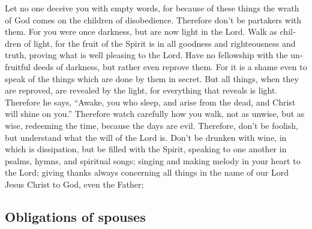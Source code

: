 \begin{paracol}{2}
\begin{otherlanguage}{english}
 Let no one deceive you with empty words, for because of
these things the wrath of God comes on the children of disobedience.
 Therefore don't be partakers with them. 
For you were once darkness, but are now light in the Lord. Walk as
children of light,  for the fruit of the Spirit is in all
goodness and righteousness and truth,  proving what is
well pleasing to the Lord.  Have no fellowship with the
unfruitful deeds of darkness, but rather even reprove them.
 For it is a shame even to speak of the things which are
done by them in secret.  But all things, when they are
reproved, are revealed by the light, for everything that reveals is
light.  Therefore he says, ``Awake, you who sleep, and
arise from the dead, and Christ will shine on you.'' 
Therefore watch carefully how you walk, not as unwise, but as wise,
 redeeming the time, because the days are evil.
 Therefore, don't be foolish, but understand what the
will of the Lord is.  Don't be drunken with wine, in
which is dissipation, but be filled with the Spirit, 
speaking to one another in psalms, hymns, and spiritual songs; singing
and making melody in your heart to the Lord;  giving
thanks always concerning all things in the name of our Lord Jesus Christ
to God, even the Father;

\hypertarget{obligations-of-spouses}{%
\subsection{Obligations of spouses}\label{obligations-of-spouses}}


\end{otherlanguage}
\end{paracol}
